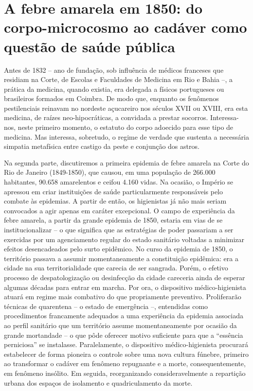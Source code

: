 \chapter{A febre amarela em 1850: do corpo-microcosmo ao cadáver como
questão de saúde
pública}

Antes de 1832 -- ano de fundação, sob influência de médicos franceses
que residiam na Corte, de Escolas e Faculdades de Medicina em Rio e
Bahia --, a prática da medicina, quando existia, era delegada a físicos
portugueses ou brasileiros formados em Coimbra. De modo que, enquanto os
fenômenos pestilenciais reinavam no nordeste açucareiro nos séculos XVII
ou XVIII, era esta medicina, de raízes neo-hipocráticas, a convidada a
prestar socorros. Interessa-nos, neste primeiro momento, o estatuto do
corpo adoecido para esse tipo de medicina. Mas interessa, sobretudo, o
regime de verdade que sustenta a necessária simpatia metafísica entre
castigo da peste e conjunção dos astros.

Na segunda parte, discutiremos a primeira epidemia de febre amarela na
Corte do Rio de Janeiro (1849-1850), que causou, em uma população de
266.000 habitantes, 90.658 amarelentos e ceifou 4.160 vidas. Na ocasião,
o Império se apressou em criar instituições de saúde particularmente
responsáveis pelo combate às epidemias. A partir de então, os
higienistas já não mais seriam convocados a agir apenas em caráter
excepcional. O campo de experiência da febre amarela, a partir da grande
epidemia de 1850, estaria em vias de se institucionalizar -- o que
significa que as estratégias de poder passariam a ser exercidas por um
agenciamento regular do estado sanitário voltadas a minimizar efeitos
desencadeados pelo surto epidêmico. No curso da epidemia de 1850, o
território passava a assumir momentaneamente a constituição epidêmica:
era a cidade na sua territorialidade que carecia de ser sangrada. Porém,
o efetivo processo de despatologização ou desinfecção da cidade
careceria ainda de esperar algumas décadas para entrar em marcha. Por
ora, o dispositivo médico-higienista atuará em regime mais combativo do
que propriamente preventivo. Proliferarão técnicas de quarentena -- o
estado de emergência --, entendidas como procedimentos francamente
adequados a uma experiência da epidemia associada ao perfil sanitário
que um território assume momentaneamente por ocasião da grande
mortandade -- o que pôde oferecer motivo suficiente para que a
``essência perniciosa'' se instalasse. Paralelamente, o dispositivo
médico-higienista procurará estabelecer de forma pioneira o controle
sobre uma nova cultura fúnebre, primeiro ao transformar o cadáver em
fenômeno repugnante e a morte, consequentemente, em fenômeno insólito.
Em seguida, reorganizando consideravelmente a repartição urbana dos
espaços de isolamento e quadriculamento da morte.

